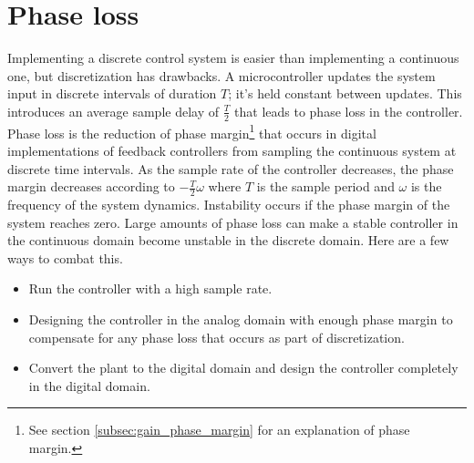 \section{Phase loss}

Implementing a discrete control system is easier than implementing a continuous
one, but \gls{discretization} has drawbacks. A microcontroller updates the
system input in discrete intervals of duration $T$; it's held constant between
updates. This introduces an average sample delay of $\frac{T}{2}$ that leads to
phase loss in the controller. Phase loss is the reduction of
\gls{phase margin}\footnote{See section \ref{subsec:gain_phase_margin} for an
explanation of phase margin.} that occurs in digital implementations of feedback
controllers from sampling the continuous \gls{system} at discrete time
intervals. As the sample rate of the controller decreases, the \gls{phase
margin} decreases according to $-\frac{T}{2}\omega$ where $T$ is the sample
period and $\omega$ is the frequency of the \gls{system} dynamics. Instability
occurs if the \gls{phase margin} of the \gls{system} reaches zero. Large amounts
of phase loss can make a stable controller in the continuous domain become
unstable in the discrete domain. Here are a few ways to combat this.
\begin{itemize}
  \item Run the controller with a high sample rate.
  \item Designing the controller in the analog domain with enough
    \gls{phase margin} to compensate for any phase loss that occurs as part of
    \gls{discretization}.
  \item Convert the \gls{plant} to the digital domain and design the controller
    completely in the digital domain.
\end{itemize}

